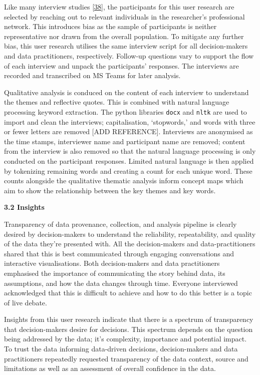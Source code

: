 \documentclass{article}
\begin{document}
Like many interview studies \protect\hyperlink{ref-futzing}{{[}38{]}},
the participants for this user research are selected by reaching out to
relevant individuals in the researcher's professional network. This
introduces bias as the sample of participants is neither representative
nor drawn from the overall population. To mitigate any further bias,
this user research utilises the same interview script for all
decision-makers and data practitioners, respectively. Follow-up
questions vary to support the flow of each interview and unpack the
participants' responses. The interviews are recorded and transcribed on
MS Teams for later analysis.

Qualitative analysis is conduced on the content of each interview to
understand the themes and reflective quotes. This is combined with
natural language processing keyword extraction. The python libraries
\texttt{docx} and \texttt{nltk} are used to import and clean the
interviews; capitalisation, `stopwords,' and words with three or fewer
letters are removed {[}ADD REFERENCE{]}. Interviews are anonymised as
the time stamps, interviewer name and participant name are removed;
content from the interview is also removed so that the natural language
processing is only conducted on the participant responses. Limited
natural language is then applied by tokenizing remaining words and
creating a count for each unique word. These counts alongside the
qualitative thematic analysis inform concept maps which aim to show the
relationship between the key themes and key words.

\textbf{3.2 Insights}

Transparency of data provenance, collection, and analysis pipeline is
clearly desired by decision-makers to understand the reliability,
repeatability, and quality of the data they're presented with. All the
decision-makers and data-practitioners shared that this is best
communicated through engaging conversations and interactive
visualisations. Both decision-makers and data practitioners emphasised
the importance of communicating the story behind data, its assumptions,
and how the data changes through time. Everyone interviewed acknowledged
that this is difficult to achieve and how to do this better is a topic
of live debate.

Insights from this user research indicate that there is a spectrum of
transparency that decision-makers desire for decisions. This spectrum
depends on the question being addressed by the data; it's complexity,
importance and potential impact. To trust the data informing data-driven
decisions, decision-makers and data practitioners repeatedly requested
transparency of the data context, source and limitations as well as an
assessment of overall confidence in the data.
\end{document}
